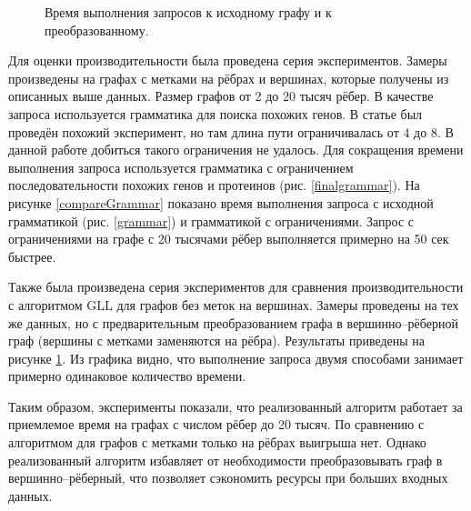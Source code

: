 \documentclass[14pt]{matmex-diploma}
\begin{document}
\begin{figure}
\begin{center}
\end{center}
\caption{Время выполнения запросов к исходному графу и к преобразованному.}
\label{compareGraph}
\end{figure}

Для оценки производительности была проведена серия экспериментов. Замеры произведены на графах с метками на рёбрах и вершинах, которые получены из описанных выше данных. Размер графов от 2 до 20 тысяч рёбер. В качестве запроса используется грамматика для поиска похожих генов. В статье \cite{subgraph} был проведён похожий эксперимент, но там длина пути ограничивалась от 4 до 8. В данной работе добиться такого ограничения не удалось. Для сокращения времени выполнения запроса используется грамматика с ограничением последовательности похожих генов и протеинов (рис. \ref{finalgrammar}). На рисунке \ref{compareGrammar} показано время выполнения запроса с исходной грамматикой (рис. \ref{grammar}) и грамматикой с ограничениями. Запрос с ограничениями на графе с 20 тысячами рёбер выполняется примерно на 50 сек быстрее.

Также была произведена серия экспериментов для сравнения производительности с алгоритмом GLL для графов без меток на вершинах. Замеры проведены на тех же данных, но с предварительным преобразованием графа в вершинно--рёберной граф (вершины с метками заменяются на рёбра). Результаты приведены на рисунке \ref{compareGraph}. Из графика видно, что выполнение запроса двумя способами занимает примерно одинаковое количество времени.

Таким образом, эксперименты показали, что реализованный алгоритм работает за приемлемое время на графах с числом рёбер до 20 тысяч. По сравнению с алгоритмом для графов с метками только на рёбрах выигрыша нет. Однако реализованный алгоритм избавляет от необходимости преобразовывать граф в вершинно--рёберный, что позволяет сэкономить ресурсы при больших входных данных.
\end{document}
